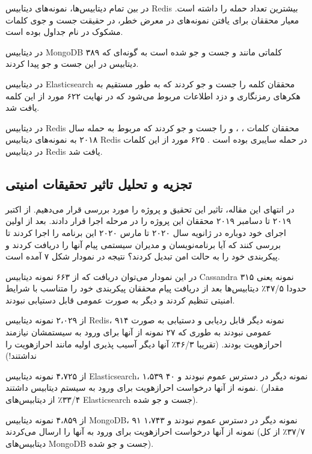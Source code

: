 \documentclass[10pt, a4paper]{article}
\begin{document}
در بین تمام دیتابیس‌ها، نمونه‌های دیتابیس Redis بیشترین تعداد حمله را داشته است.
معیار محققان برای یافتن نمونه‌های در معرض خطر، در حقیقت جست و جوی کلمات مشکوک در
نام جداول بوده است.

در دیتابیس MongoDB کلماتی مانند  و  جست و جو شده است به گونه‌ای که ۳۸۹ دیتابیس در این جست و جو پیدا کردند.

در دیتابیس Elasticsearch محققان کلمه  را جست و جو کردند که به طور
مستقیم به هکر‌های رمزنگاری و دزد اطلاعات مربوط می‌شود که در نهایت ۶۲۲ مورد از
این کلمه یافت شد.

در دیتابیس Redis محققان کلمات ، ،  و
 را جست و جو کردند که مربوط به حمله سال ۲۰۱۸ به نمونه‌های دیتابیس
Redis در حمله سایبری بوده است \cite{openRediServer}. ۶۲۵ مورد از این کلمات در
دیتابیس Redis یافت شد.

\subsection{تجزیه و تحلیل تاثیر تحقیقات امنیتی}

در انتهای این مقاله، تاثیر این تحقیق و پروژه را مورد بررسی قرار می‌دهیم. از
اکتبر ۲۰۱۹ تا دسامبر ۲۰۱۹ محققان این پروژه را در مرحله اجرا قرار دادند. بعد از
اولین اجرای خود دوباره در ژانویه سال ۲۰۲۰ تا مارس ۲۰۲۰ این برنامه را اجرا کردند
تا بررسی کنند که آیا برنامه‌نویسان و مدیران سیستمی پیام آنها را دریافت کردند و
پیکربندی خود را به حالت امن تبدیل کردند؟ نتیجه در نمودار شکل ۷ آمده است.

در این نمودار می‌توان دریافت که از ۶۶۳ نمونه دیتابیس Cassandra ۳۱۵ نمونه یعنی
حدودا ۴۷/۵٪ دیتابیس‌ها بعد از دریافت پیام محققان پیکربندی خود را متناسب با شرایط
امنیتی تنظیم کردند و دیگر به صورت عمومی قابل دستیابی نبودند.

از ۲،۰۲۹ نمونه دیتابیس Redis، ۹۱۴ نمونه دیگر قابل ردیابی و دستیابی به صورت عمومی
نبودند به طوری که ۲۷ نمونه از آنها برای ورود به سیستمشان نیازمند احرازهویت
بودند. (تقریبا ۴۶/۳٪ آنها دیگر آسیب پذیری اولیه مانند احرازهویت را نداشتند!)

از ۴،۷۲۵ نمونه دیتابیس Elasticsearch، ۱،۵۳۹ نمونه دیگر در دسترس عموم نبودند و ۴۰
نمونه از آنها درخواست احرازهویت برای ورود به سیستم دیتابیس داشتند. (مقدار ۳۳/۴٪
از دیتابیس‌های Elasticsearch جست و جو شده).

از ۴،۸۵۹ نمونه دیتابیس MongoDB، ۹۱ نمونه دیگر در دسترس عموم نبودند و ۱،۷۴۳ نمونه
از آنها درخواست احرازهویت برای ورود به آنها را ارسال می‌کردند (۳۷/۷٪ از کل
دیتابیس‌های MongoDB جست و جو شده).
\end{document}

